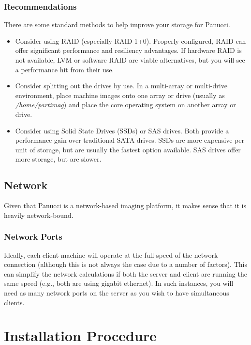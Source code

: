 \documentclass{article}
\begin{document}
\subsubsection{Recommendations}
There are some standard methods to help improve your storage for Panucci.
\begin{itemize}
  \item Consider using RAID (especially RAID 1+0).  Properly configured, RAID can offer significant performance and resiliency advantages.  If hardware RAID is not available, LVM or software RAID are viable alternatives, but you will see a performance hit from their use.
  \item Consider splitting out the drives by use.  In a multi-array or multi-drive environment, place machine images onto one array or drive (usually as \textit{/home/partimag}) and place the core operating system on another array or drive.
  \item Consider using Solid State Drives (SSDs) or SAS drives.  Both provide a performance gain over traditional SATA drives.  SSDs are more expensive per unit of storage, but are usually the fastest option available.  SAS drives offer more storage, but are slower.
\end{itemize}
\subsection{Network}
Given that Panucci is a network-based imaging platform, it makes sense that it is heavily network-bound.
\subsubsection{Network Ports}
Ideally, each client machine will operate at the full speed of the network connection (although this is not always the case due to a number of factors).  This can simplify the network calculations if both the server and client are running the same speed (e.g., both are using gigabit ethernet).  In such instances, you will need as many network ports on the server as you wish to have simultaneous clients.

\pagebreak
\section{Installation Procedure}
\end{document}
